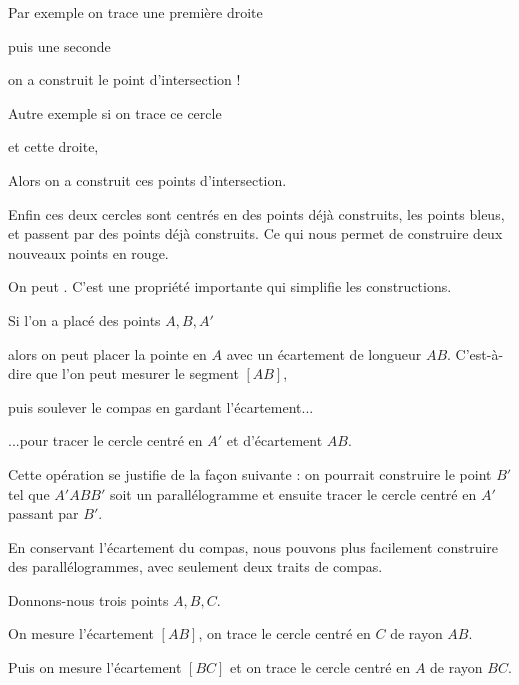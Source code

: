 \change

\change
Par exemple on trace une première droite

\change
puis une seconde

\change
on a construit le point d'intersection !

\change

\change
Autre exemple si on trace ce cercle 

\change
et cette droite,

\change
Alors on a construit ces points d'intersection.

\change

\change

\change

Enfin ces deux cercles sont centrés en des points déjà construits, les points bleus,
et passent par des points déjà construits. Ce qui nous permet de construire deux nouveaux points en rouge.



\diapo


On peut . 
C'est une propriété importante qui simplifie les constructions.
 
\change 
Si l'on a placé des points $A,B,A'$

\change
  alors on peut placer la pointe en $A$ avec un écartement de longueur $AB$. 
  C'est-à-dire que l'on peut mesurer le segment $[AB]$, 
  
\change
puis soulever le compas en gardant l'écartement... 


\change
...pour tracer le cercle centré en $A'$ et d'écartement $AB$. 

\change
  Cette opération se justifie de la façon suivante : on pourrait construire le point 
  $B'$ tel que $A'ABB'$ soit un parallélogramme et ensuite tracer le cercle centré en $A'$
  passant par $B'$.


\diapo

En conservant l'écartement du compas, nous pouvons plus facilement construire 
  des parallélogrammes, avec seulement deux traits de compas. 
  
Donnons-nous trois points $A,B,C$.  
  
\change
On mesure l'écartement $[AB]$, on trace le cercle centré en $C$ de rayon $AB$.
  
\change  
Puis on mesure l'écartement $[BC]$ et on trace le cercle centré en $A$ de rayon $BC$.  
  
